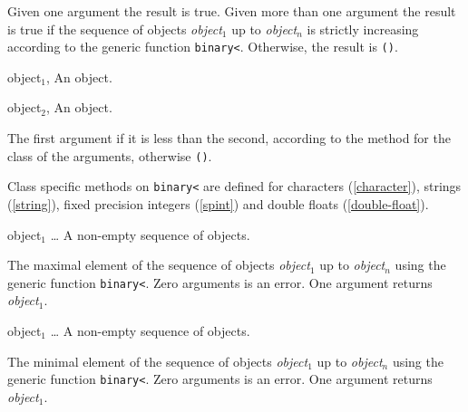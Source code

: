 \begin{optDefinition}
\result%
Given one argument the result is true.  Given more than one argument
the result is true if the sequence of objects {\em object$_1$} up to
{\em object$_n$} is strictly increasing according to the generic
function {\tt binary<}.  Otherwise, the result is {\tt ()}.


\begin{genericargs}
\item[object$_1$, \objectclass] An object.
\item[object$_2$, \objectclass] An object.
\end{genericargs}

\result%
The first argument if it is less than the second, according to the
method for the class of the arguments, otherwise {\tt ()}.

\seealso%
Class specific methods on {\tt binary<} are defined for characters
(\ref{character}), strings (\ref{string}), fixed precision integers
(\ref{spint}) and double floats (\ref{double-float}).


\begin{arguments}

\item[object$_1$ \ldots] A non-empty sequence of objects.

\end{arguments}

\result%
The maximal element of the sequence of objects {\em object$_1$} up to
{\em object$_n$} using the generic function {\tt binary<}.  Zero
arguments is an error.  One argument returns {\em object$_1$}.


\begin{arguments}

\item[object$_1$ \ldots] A non-empty sequence of objects.

\end{arguments}

\result%
The minimal element of the sequence of objects {\em object$_1$} up to
{\em object$_n$} using the generic function {\tt binary<}.  Zero
arguments is an error.  One argument returns {\em object$_1$}.

\end{optDefinition}
